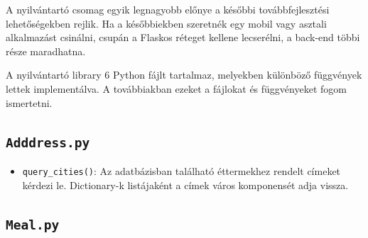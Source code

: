 A nyilvántartó csomag egyik legnagyobb előnye a későbbi továbbfejlesztési lehetőségekben rejlik. Ha a későbbiekben szeretnék egy mobil vagy asztali alkalmazást csinálni, csupán a Flaskos réteget kellene lecserélni, a back-end többi része maradhatna.

A nyilvántartó library 6 Python fájlt tartalmaz, melyekben különböző függvények lettek implementálva. A továbbiakban ezeket a fájlokat és függvényeket fogom ismertetni.

\subsection{\texttt{Adddress.py}}

\begin{itemize}
    \item \texttt{query\_cities()}: Az adatbázisban található éttermekhez rendelt címeket kérdezi le. Dictionary-k listájaként a címek város komponensét adja vissza.
\end{itemize}

\subsection{\texttt{Meal.py}}

